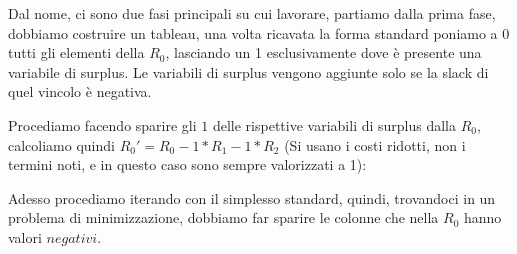 \documentclass{article}
\begin{document}
Dal nome, ci sono due fasi principali su cui lavorare, partiamo dalla prima fase, dobbiamo costruire un tableau, una volta ricavata la forma standard poniamo a 0 tutti gli elementi della $R_0$, lasciando un 1 esclusivamente dove è presente una variabile di surplus.
Le variabili di surplus vengono aggiunte solo se la slack di quel vincolo è negativa.

\begin{center}
\end{center}

Procediamo facendo sparire gli $1$ delle rispettive variabili di surplus dalla $R_0$, calcoliamo quindi $R_0' = R_0 - 1 * R_1 - 1 * R_2$    (Si usano i costi ridotti, non i termini noti, e in questo caso sono sempre valorizzati a 1):\\
\begin{center}
\end{center}


Adesso procediamo iterando con il simplesso standard, quindi, trovandoci in un problema di minimizzazione, dobbiamo far sparire le colonne che nella $R_0$ hanno valori $negativi$.\\

\begin{center}
\end{center}
\end{document}
